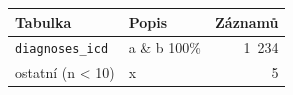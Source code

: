 \begin{tabular}{llr}
\toprule
Tabulka & Popis & Záznamů\\
\midrule
\texttt{diagnoses\_icd} & a \& b 100\% & 1 234\\
ostatní (n \textless{} 10) & x & 5\\
\bottomrule
\end{tabular}
